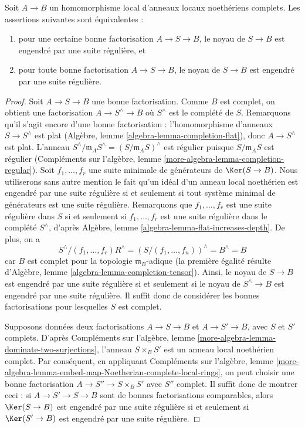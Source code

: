 \begin{lemma}
\label{lemma-ci-map-well-defined}
Soit $A \to B$ un homomorphisme local d'anneaux locaux noethériens complets.
Les assertions suivantes sont équivalentes :
\begin{enumerate}
\item pour une certaine bonne factorisation $A \to S \to B$, le noyau de
$S \to B$ est engendré par une suite régulière, et
\item pour toute bonne factorisation $A \to S \to B$, le noyau de
$S \to B$ est engendré par une suite régulière.
\end{enumerate}
\end{lemma}

\begin{proof}
Soit $A \to S \to B$ une bonne factorisation.
Comme $B$ est complet, on obtient une factorisation
$A \to S^\wedge \to B$ où $S^\wedge$ est le complété de $S$.
Remarquons qu'il s'agit encore d'une bonne factorisation :
l'homomorphisme d'anneaux $S \to S^\wedge$ est plat
(Algèbre, lemme \ref{algebra-lemma-completion-flat}),
donc $A \to S^\wedge$ est plat.
L'anneau $S^\wedge/\mathfrak m_A S^\wedge = (S/\mathfrak m_A S)^\wedge$
est régulier puisque $S/\mathfrak m_A S$ est régulier
(Compléments sur l'algèbre, lemme \ref{more-algebra-lemma-completion-regular}).
Soit $f_1, \ldots, f_r$ une suite minimale de générateurs
de $\Ker(S \to B)$. Nous utiliserons sans autre mention
le fait qu'un idéal d'un anneau local noethérien est engendré par une suite
régulière si et seulement si tout système minimal de générateurs est une
suite régulière. Remarquons que $f_1, \ldots, f_r$
est une suite régulière dans $S$ si et seulement si $f_1, \ldots, f_r$
est une suite régulière dans le complété $S^\wedge$, d'après
Algèbre, lemme \ref{algebra-lemma-flat-increases-depth}.
De plus, on a
$$
S^\wedge/(f_1, \ldots, f_r)R^\wedge =
(S/(f_1, \ldots, f_n))^\wedge = B^\wedge = B
$$
car $B$ est complet pour la topologie $\mathfrak m_B$-adique (la première égalité
résulte d'Algèbre, lemme \ref{algebra-lemma-completion-tensor}).
Ainsi, le noyau de $S \to B$ est engendré par une suite régulière
si et seulement si le noyau de $S^\wedge \to B$ est engendré par une
suite régulière.
Il suffit donc de considérer les bonnes factorisations pour lesquelles $S$ est complet.

\medskip\noindent
Supposons données deux factorisations $A \to S \to B$ et
$A \to S' \to B$, avec $S$ et $S'$ complets. D'après
Compléments sur l'algèbre, lemme \ref{more-algebra-lemma-dominate-two-surjections},
l'anneau $S \times_B S'$ est un anneau local noethérien complet.
Par conséquent, en appliquant Compléments sur l'algèbre, lemme
\ref{more-algebra-lemma-embed-map-Noetherian-complete-local-rings},
on peut choisir une bonne factorisation $A \to S'' \to S \times_B S'$
avec $S''$ complet. Il suffit donc de montrer ceci :
si $A \to S' \to S \to B$ sont de bonnes factorisations comparables,
alors $\Ker(S \to B)$ est engendré par une suite régulière
si et seulement si $\Ker(S' \to B)$ est engendré par une suite régulière.


\end{proof}
